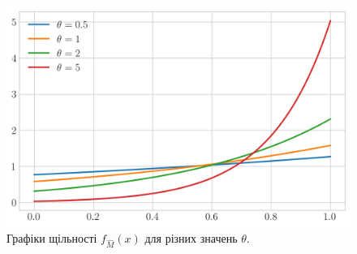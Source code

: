 \begin{theorem}
\begin{figure}[H]
    \end{figure}
    \begin{figure}[H]
        \centering
        \includegraphics[scale=0.65]{plots/pdf_max_hat.png}
        \caption{Графіки щільності $f_{\widehat{M}}(x)$ для різних значень $\theta$.}
    \end{figure}
\end{theorem}
